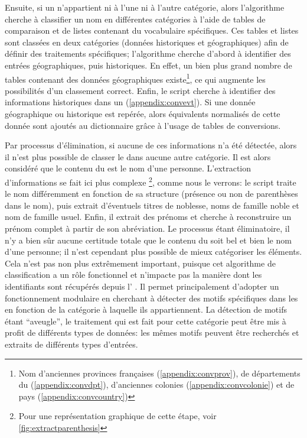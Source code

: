 Ensuite, si un \tname{} n'appartient ni à l'une ni à l'autre catégorie, alors l'algorithme cherche à classifier un nom en différentes catégories à l'aide de tables de comparaison et de listes contenant du vocabulaire spécifiques. Ces tables et listes sont classées en deux catégories (données historiques et géographiques) afin de définir des traitements spécifiques; l'algorithme cherche d'abord à identifier des entrées géographiques, puis historiques. En effet, un bien plus grand nombre de tables contenant des données géographiques existe\footnote{Nom d'anciennes provinces françaises (\ref{appendix:convprov}), de départements du  (\ref{appendix:convdpt}), d'anciennes colonies (\ref{appendix:convcolonie}) et de pays (\ref{appendix:convcountry})}, ce qui augmente les possibilités d'un classement correct. Enfin, le script cherche à identifier des informations historiques dans un \tname{} (\ref{appendix:convevt}). Si une donnée géographique ou historique est repérée, alors équivalents normalisés de cette donnée sont ajoutés au \gls{dictionnaire} grâce à l'usage de tables de conversions. 

Par processus d'élimination, si aucune de ces informations n'a été détectée, alors il n'est plus possible de classer le \tname{} dans aucune autre catégorie. Il est alors considéré que le contenu du \tname{} est le nom d'une personne. L'extraction d'informations se fait ici plus complexe \footnote{Pour une représentation graphique de cette étape, voir \ref{fig:extractparenthesis}}, comme nous le verrons: le script traite le nom différemment en fonction de sa structure (présence ou non de parenthèses dans le nom), puis extrait d'éventuels titres de noblesse, noms de famille noble et nom de famille usuel. Enfin, il extrait des prénoms et cherche à reconstruire un prénom complet à partir de son abréviation. Le processus étant éliminatoire, il n'y a bien sûr aucune certitude totale que le contenu du \tname{} soit bel et bien le nom d'une personne; il n'est cependant plus possible de mieux catégoriser les éléments. Cela n'est pas non plus extrêmement important, puisque cet algorithme de classification a un rôle fonctionnel et n'impacte pas la manière dont les identifiants sont récupérés depuis l'\api{} \wkd{}. Il permet principalement d'adopter un fonctionnement modulaire en cherchant à détecter des motifs spécifiques dans les \tname{} en fonction de la catégorie à laquelle ils appartiennent. La détection de motifs étant \enquote{aveugle}, le traitement qui est fait pour cette catégorie peut être mis à profit de différents types de données: les mêmes motifs peuvent être recherchés et extraits de différents types d'entrées.

